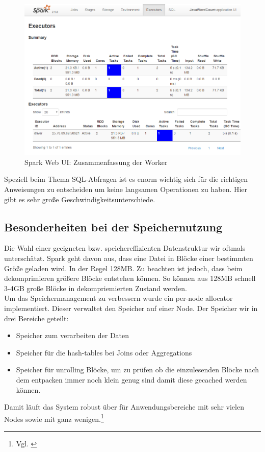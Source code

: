 \begin{figure}[h]
  \centering
  \includegraphics[width=\textwidth]{./bilder/spark_ui_worker.PNG}
  \caption{Spark Web UI: Zusammenfassung der Worker}\label{fig:spark_ui_worker}
\end{figure}

\noindent
Speziell beim Thema SQL-Abfragen ist es enorm wichtig sich für die richtigen Anweisungen zu entscheiden um keine langsamen Operationen zu haben. 
Hier gibt es sehr große Geschwindigkeitsunterschiede.



\subsection{Besonderheiten bei der Speichernutzung}
Die Wahl einer geeigneten bzw. speichereffizienten Datenstruktur wir oftmals unterschätzt. 
Spark geht davon aus, dass eine Datei in Blöcke einer bestimmten Größe geladen wird. In der Regel 128MB. Zu beachten ist jedoch, dass beim dekomprimieren größere Blöcke entstehen können. So können aus 128MB schnell 3-4GB große Blöcke in dekompriemierten Zustand werden. \\ 

\noindent
Um das Speichermanagement zu verbessern wurde ein per-node allocator implementiert. Dieser verwaltet den Speicher auf einer Node. 
Der Speicher wir in drei Bereiche geteilt:
\begin{itemize}
	\item Speicher zum verarbeiten der Daten
	\item Speicher für die hash-tables bei Joins oder Aggregations
	\item Speicher für \glqq{}unrolling\grqq{} Blöcke, um zu prüfen ob die einzulesenden Blöcke nach dem entpacken immer noch klein genug sind damit diese gecached werden können.
\end{itemize}
\noindent
Damit läuft das System robust über für Anwendungsbereiche mit sehr vielen Nodes sowie mit ganz wenigen.\footnote{Vgl. \cite{ADD+15}}

